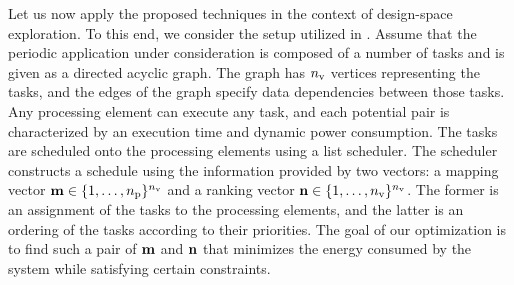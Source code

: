 Let us now apply the proposed techniques in the context of design-space exploration.
To this end, we consider the setup utilized in \cite{ukhov2012}.
Assume that the periodic application under consideration is composed of a number of tasks and is given as a directed acyclic graph.
The graph has ${n_\text{v}}$ vertices representing the tasks, and the edges of the graph specify data dependencies between those tasks.
Any processing element can execute any task, and each potential pair is characterized by an execution time and dynamic power consumption.
The tasks are scheduled onto the processing elements using a list scheduler.
The scheduler constructs a schedule using the information provided by two vectors: a mapping vector $\mathbf{m} \in \{ 1, \dotsc, {n_\text{p}} \}^{n_\text{v}}$ and a ranking vector $\mathbf{n} \in \{ 1, \dotsc, {n_\text{v}} \}^{n_\text{v}}$.
The former is an assignment of the tasks to the processing elements, and the latter is an ordering of the tasks according to their priorities.
The goal of our optimization is to find such a pair of $\mathbf{m}$ and $\mathbf{n}$ that minimizes the energy consumed by the system while satisfying certain constraints.

